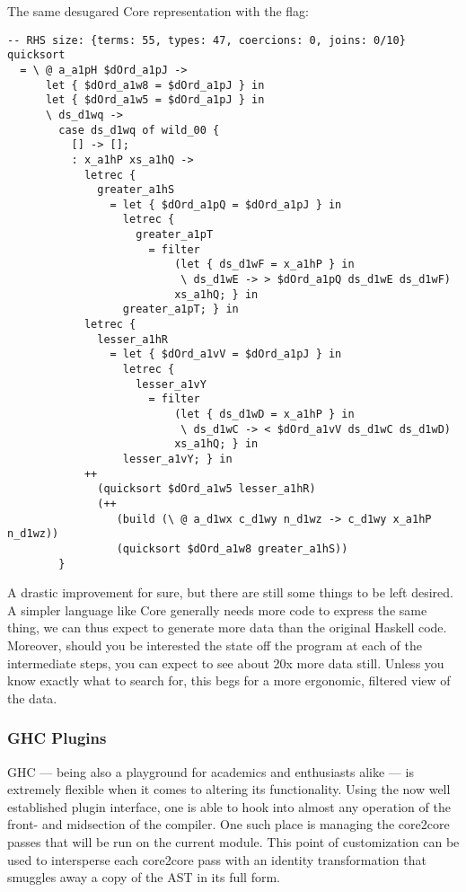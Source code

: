 The same desugared Core representation with the  flag:

\begin{listing}[H]
\begin{verbatim}
-- RHS size: {terms: 55, types: 47, coercions: 0, joins: 0/10}
quicksort
  = \ @ a_a1pH $dOrd_a1pJ ->
      let { $dOrd_a1w8 = $dOrd_a1pJ } in
      let { $dOrd_a1w5 = $dOrd_a1pJ } in
      \ ds_d1wq ->
        case ds_d1wq of wild_00 {
          [] -> [];
          : x_a1hP xs_a1hQ ->
            letrec {
              greater_a1hS
                = let { $dOrd_a1pQ = $dOrd_a1pJ } in
                  letrec {
                    greater_a1pT
                      = filter
                          (let { ds_d1wF = x_a1hP } in
                           \ ds_d1wE -> > $dOrd_a1pQ ds_d1wE ds_d1wF)
                          xs_a1hQ; } in
                  greater_a1pT; } in
            letrec {
              lesser_a1hR
                = let { $dOrd_a1vV = $dOrd_a1pJ } in
                  letrec {
                    lesser_a1vY
                      = filter
                          (let { ds_d1wD = x_a1hP } in
                           \ ds_d1wC -> < $dOrd_a1vV ds_d1wC ds_d1wD)
                          xs_a1hQ; } in
                  lesser_a1vY; } in
            ++
              (quicksort $dOrd_a1w5 lesser_a1hR)
              (++
                 (build (\ @ a_d1wx c_d1wy n_d1wz -> c_d1wy x_a1hP n_d1wz))
                 (quicksort $dOrd_a1w8 greater_a1hS))
        }

\end{verbatim}
\label{code:quicksort_core_dsuppress}
\end{listing}

A drastic improvement for sure, but there are still some things to be left desired.
A simpler language like Core generally needs more code to express the same thing, we can thus expect
to generate more data than the original Haskell code. Moreover, should you be interested the state off
the program at each of the intermediate steps, you can expect to see about 20x more data still.
Unless you know exactly what to search for, this begs for a more ergonomic, filtered view of the data.

\subsubsection{GHC Plugins}

GHC --- being also a playground for academics and enthusiasts alike --- is extremely flexible when it comes to
altering its functionality. Using the now well established plugin interface, one is able to hook into almost
any operation of the front- and midsection of the compiler. One such place is managing the core2core passes that
will be run on the current module. This point of customization can be used to intersperse each core2core pass with an
identity transformation that smuggles away a copy of the AST in its full form.

